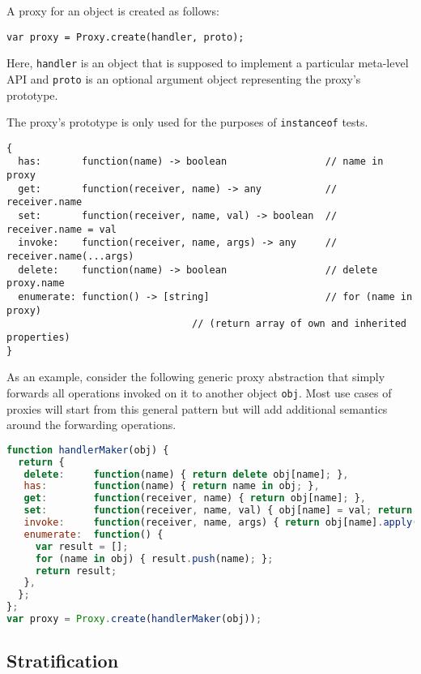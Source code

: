 \documentclass{acm_proc_article-sp}
\begin{document}
A proxy for an object is created as follows:

\begin{lstlisting}
var proxy = Proxy.create(handler, proto);
\end{lstlisting}

Here, \texttt{handler} is an object that is supposed to implement a particular meta-level API and \texttt{proto} is an optional argument object representing the proxy's prototype.

The proxy's prototype is only used for the purposes of \texttt{instanceof} tests. %

\begin{lstlisting}
{
  has:       function(name) -> boolean                 // name in proxy
  get:       function(receiver, name) -> any           // receiver.name
  set:       function(receiver, name, val) -> boolean  // receiver.name = val
  invoke:    function(receiver, name, args) -> any     // receiver.name(...args)
  delete:    function(name) -> boolean                 // delete proxy.name
  enumerate: function() -> [string]                    // for (name in proxy)
                                // (return array of own and inherited properties)
}
\end{lstlisting}

As an example, consider the following generic proxy abstraction that simply forwards all operations invoked on it to another object \texttt{obj}. Most use cases of proxies will start from this general pattern but will add additional semantics around the forwarding operations.

\begin{lstlisting}[language=javascript]
function handlerMaker(obj) {
  return {
   delete:     function(name) { return delete obj[name]; },    
   has:        function(name) { return name in obj; },
   get:        function(receiver, name) { return obj[name]; },
   set:        function(receiver, name, val) { obj[name] = val; return true; },
   invoke:     function(receiver, name, args) { return obj[name].apply(obj,args); },
   enumerate:  function() {
     var result = [];
     for (name in obj) { result.push(name); };
     return result;
   }, 
  };
};
var proxy = Proxy.create(handlerMaker(obj));
\end{lstlisting}

\subsection{Stratification}
\end{document}

